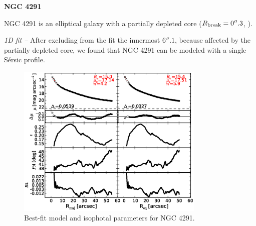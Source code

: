 \documentclass[preprint2]{emulateapj}
\newcommand{\fitfigurewidth}{0.8\textwidth}
\begin{document}
  \clearpage\newpage\noindent
  {\bf NGC 4291 \\}

  NGC 4291 is an elliptical galaxy with a partially depleted core ($R_{\rm break} = 0''.3$, \citealt{rusli2013}).


  \emph{1D fit -- }
  After excluding from the fit the innermost $6''.1$, because affected by the partially depleted core,
  we found that NGC 4291 can be modeled with a single S\'ersic profile.

  \begin{figure}[h]
  \begin{center}
  \includegraphics[width=\fitfigurewidth]{images/n4291_1Dfit.eps}
  \caption{Best-fit model and isophotal parameters for NGC 4291.}
  \end{center}
  \end{figure}
\end{document}

